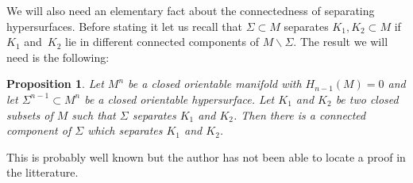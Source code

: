 \documentclass[pdftex]{sigma}
\numberwithin{equation}{section}
\newtheorem{prop}[thm]{Proposition}
{ \theoremstyle{definition}
\newtheorem{dfn}[thm]{Definition}
\newtheorem{Note}[thm]{Note}
\newtheorem{ex}[thm]{Example}
\newtheorem{rem}[thm]{Remark} }
\begin{document}
We will also need an elementary fact about the connectedness of separating hypersurfaces. Before stating it let us recall that $\Sigma\subset M$ separates $K_1, K_2 \subset M$ if~$K_1$ and~$K_2$ lie in different connected components of $M\backslash\Sigma$. The result we will need is the following:

\begin{prop}\label{prop-connect}
 Let $M^n$ be a closed orientable manifold with $H_{n-1}(M) = 0$ and
 let \mbox{$\Sigma^{n-1}\!\subset\! M^n$} be a closed orientable
 hypersurface. Let $K_1$ and $K_2$ be two closed subsets of $M$ such
 that $\Sigma$ separates $K_1$ and $K_2$. Then there is a connected
 component of $\Sigma$ which separates $K_1$ and $K_2$.
\end{prop}

This is probably well known but the author has not been able to locate a proof in the litterature.
\end{document}
